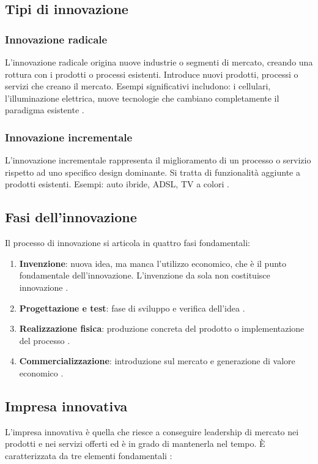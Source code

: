 \documentclass[12pt,a4paper]{article}
\begin{document}
\subsection{Tipi di innovazione}

\subsubsection{Innovazione radicale}
L'innovazione radicale origina nuove industrie o segmenti di mercato, creando una rottura con i prodotti o processi esistenti. Introduce nuovi prodotti, processi o servizi che creano il mercato. Esempi significativi includono: i cellulari, l'illuminazione elettrica, nuove tecnologie che cambiano completamente il paradigma esistente .

\subsubsection{Innovazione incrementale}
L'innovazione incrementale rappresenta il miglioramento di un processo o servizio rispetto ad uno specifico design dominante. Si tratta di funzionalità aggiunte a prodotti esistenti. Esempi: auto ibride, ADSL, TV a colori .

\subsection{Fasi dell'innovazione}
Il processo di innovazione si articola in quattro fasi fondamentali:

\begin{enumerate}
    \item \textbf{Invenzione}: nuova idea, ma manca l'utilizzo economico, che è il punto fondamentale dell'innovazione. L'invenzione da sola non costituisce innovazione .
    \item \textbf{Progettazione e test}: fase di sviluppo e verifica dell'idea .
    \item \textbf{Realizzazione fisica}: produzione concreta del prodotto o implementazione del processo .
    \item \textbf{Commercializzazione}: introduzione sul mercato e generazione di valore economico .
\end{enumerate}

\subsection{Impresa innovativa}
L'impresa innovativa è quella che riesce a conseguire leadership di mercato nei prodotti e nei servizi offerti ed è in grado di mantenerla nel tempo. È caratterizzata da tre elementi fondamentali :
\end{document}
